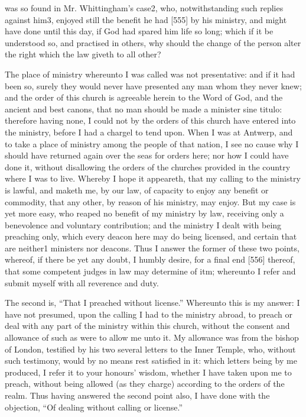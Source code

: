 was so found in Mr. Whittingham’s case2, who, notwithstanding such replies against him3, enjoyed still the benefit he had [555] by his ministry, and might have done until this day, if God had spared him life so long; which if it be understood so, and practised in others, why should the change of the person alter the right which the law giveth to all other?

The place of ministry whereunto I was called was not presentative: and if it had been so, surely they would never have presented any man whom they never knew; and the order of this church is agreeable herein to the Word of God, and the ancient and best canons, that no man should be made a minister sine titulo: therefore having none, I could not by the orders of this church have entered into the ministry, before I had a chargel to tend upon. When I was at Antwerp, and to take a place of ministry among the people of that nation, I see no cause why I should have returned again over the seas for orders here; nor how I could have done it, without disallowing the orders of the churches provided in the country where I was to live. Whereby I hope it appeareth, that my calling to the ministry is lawful, and maketh me, by our law, of capacity to enjoy any benefit or commodity, that any other, by reason of his ministry, may enjoy. But my case is yet more easy, who reaped no benefit of my ministry by law, receiving only a benevolence and voluntary contribution; and the ministry I dealt with being preaching only, which every deacon here may do being licensed, and certain that are neither1 ministers nor deacons. Thus I answer the former of these two points, whereof, if there be yet any doubt, I humbly desire, for a final end [556] thereof, that some competent judges in law may determine of itm; whereunto I refer and submit myself with all reverence and duty.

The second is, “That I preached without license.” Whereunto this is my answer: I have not presumed, upon the calling I had to the ministry abroad, to preach or deal with any part of the ministry within this church, without the consent and allowance of such as were to allow me unto it. My allowance was from the bishop of London, testified by his two several letters to the Inner Temple, who, without such testimony, would by no means rest satisfied in it: which letters being by me produced, I refer it to your honours’ wisdom, whether I have taken upon me to preach, without being allowed (as they charge) according to the orders of the realm. Thus having answered the second point also, I have done with the objection, “Of dealing without calling or license.”

